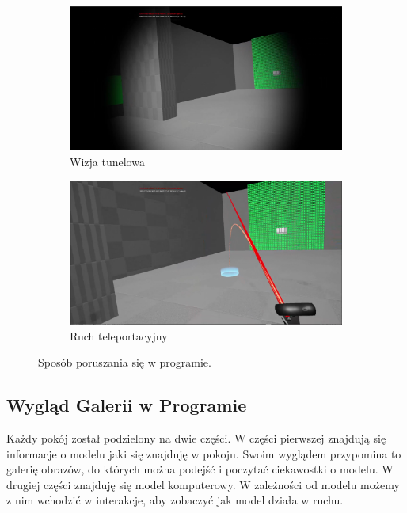 \documentclass[a4paper,12pt,reqno]{article}
\begin{document}
\begin{figure}[!ht]%
	\centering
	\begin{subfigure}{.8\textwidth}
		\centering
		\includegraphics[width=0.8\linewidth]{graphics/tunnelvisionUE4.png}
		\caption{Wizja tunelowa}	
		\label{ref:subref_a}
	\end{subfigure}%

	\begin{subfigure}{.8\textwidth}
		\centering
		\includegraphics[width=0.8\linewidth]{graphics/teleportmoveUE4.png}
		\caption{Ruch teleportacyjny}	
		\label{ref:subref_c}
	\end{subfigure}%

\caption{Sposób poruszania się w programie.}
\label{ref:ref}
\end{figure}



\newpage
\subsection{Wygląd Galerii w Programie}

Każdy pokój został podzielony na dwie części. W części pierwszej znajdują się informacje o modelu jaki się znajduję w pokoju. Swoim wyglądem przypomina to galerię obrazów, do których można podejść i poczytać ciekawostki o modelu. W drugiej części znajduję się model komputerowy. W zależności od modelu możemy z nim wchodzić w interakcje, aby zobaczyć jak model działa w ruchu.
\end{document}
